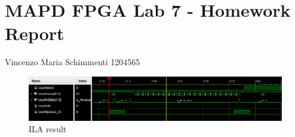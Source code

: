 \documentclass[a4paper,12pt]{article}
\begin{document}
\section*{MAPD FPGA Lab 7 - Homework Report}
Vincenzo Maria Schimmenti 1204565\\

\begin{figure}[h!]
	\begin{flushleft}
		\includegraphics[width=1.2\linewidth,keepaspectratio]{Cattura.png}
	\end{flushleft}	
	\caption{ILA result}
	\label{fig:fir5ex}
\end{figure}
\end{document}

